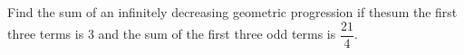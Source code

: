 
%
%
%
%
% 
% 

\question[4] Find the sum of an infinitely decreasing geometric progression if thesum the first three terms is $3$ and the sum of the first three odd terms is $\dfrac{21}{4}$.


\ifprintanswers
\fi 

